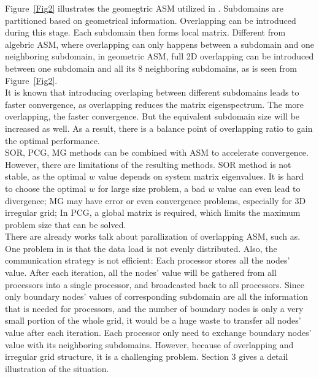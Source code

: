 \documentclass{sig-alternate}
\begin{document}
	Figure~\ref{Fig2} illustrates the geomegtric ASM utilized in \cite{Zhongyu}. Subdomains are partitioned based on
	geometrical information. Overlapping can be introduced during this stage. Each subdomain then forms local matrix.
	Different from algebric ASM, where overlapping can only happens between a subdomain and one neighboring subdomain, in 
	geometric ASM, full 2D overlapping can be introduced between one subdomain and all its 8 neighboring subdomains, as is seen from 
	Figure~\ref{Fig2}.\\
	
	It is known that introducing overlaping between different subdomains leads to faster convergence, 
	as overlapping reduces the matrix eigenspectrum\cite{Klawonn, Taopeng}. The more overlapping, the faster convergence.
	But the equivalent subdomain size will  be increased as well. As a result, there is a balance point of overlapping ratio to 
	gain the optimal performance.\\

	SOR, PCG, MG methods can be combined with ASM to accelerate convergence. However, there are limitations of the resulting
	methods. SOR method is not 
	stable, as the optimal $w$ value depends on system matrix eigenvalues. It is hard to choose the optimal $w$ for large
	size problem, a bad $w$ value can even lead to divergence; MG may have
	error or even convergence problems, especially for 3D irregular grid; In PCG, a global
	matrix is required, which limits the maximum problem size that can be solved.\\ 
	 
	There are already works talk about parallization of overlapping ASM, such as\cite{kaisun}. One problem in \cite{kaisun} is 
	that the
	data load is not evenly distributed. Also, the communication strategy is not efficient: Each processor stores all the nodes' 
	value. After each iteration, all the
	nodes' value will be gathered from all processors into a single processor, and broadcasted back to all processors. Since
	only boundary nodes' values of corresponding subdomain are all the information that is needed for processors, and the number of 
	boundary nodes is only a very small portion of the whole grid, it would be a huge waste to transfer all nodes' value 
	after each iteration. Each processor only need to exchange boundary nodes' value with its neighboring subdomains.
	However, because of overlapping and irregular grid structure, it is a challenging problem. Section 3
	gives a detail illustration of the situation.
 
\end{document}
